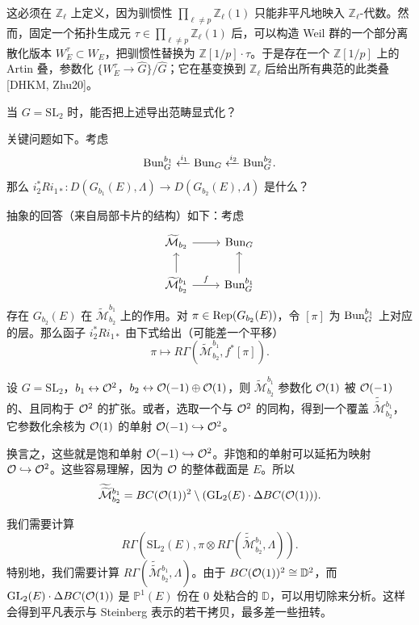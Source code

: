 这必须在 $\mathbb Z_\ell$ 上定义，因为驯惯性 $\prod_{\ell\neq p}\mathbb Z_\ell(1)$ 只能非平凡地映入 $\mathbb Z_\ell$-代数。然而，固定一个拓扑生成元 $\tau\in\prod_{\ell\neq p}\mathbb Z_\ell(1)$ 后，可以构造 Weil 群的一个部分离散化版本 $W_E^\tau\subset W_E$，把驯惯性替换为 $\mathbb Z[1/p]\cdot\tau$。于是存在一个 $\mathbb Z[1/p]$ 上的 Artin 叠，参数化 $\{W_E^\tau\to\widehat G\}/\widehat G$；它在基变换到 $\mathbb Z_\ell$ 后给出所有典范的此类叠 [DHKM, Zhu20]。

\begin{question}[Drinfeld]
当 $G=\mathrm{SL}_2$ 时，能否把上述导出范畴显式化？
\end{question}

关键问题如下。考虑
\[
\mathrm{Bun}_G^{b_1}\xleftarrow{i_1}\mathrm{Bun}_G\xleftarrow{i_2}\mathrm{Bun}_G^{b_2}.
\]
那么 $i_2^*Ri_{1*}\colon D(G_{b_1}(E),\Lambda)\to D(G_{b_2}(E),\Lambda)$ 是什么？

抽象的回答（来自局部卡片的结构）如下：考虑
\[
\begin{tikzcd}
\widetilde{\mathcal M}_{b_2} \arrow[r] & \Bun_G \\
\widetilde{\mathcal M}_{b_2}^{b_1} \arrow[r,"f"] \arrow[u] & \Bun_G^{b_1} \arrow[u]
\end{tikzcd}
\]
存在 $G_{b_2}(E)$ 在 $\widetilde{\mathcal M}_{b_2}^{b_1}$ 上的作用。对 $\pi\in\operatorname{Rep}(G_{b_2}(E))$，令 $[\pi]$ 为 $\mathrm{Bun}_G^{b_1}$ 上对应的层。那么函子 $i_2^*Ri_{1*}$ 由下式给出（可能差一个平移）
\[
\pi\mapsto R\Gamma(\widetilde{\mathcal M}_{b_2}^{b_1},f^*[\pi]).
\]


\begin{example}
设 $G=\mathrm{SL}_2$，$b_1\leftrightarrow\mathcal{O}^2$，$b_2\leftrightarrow\mathcal{O}(-1)\oplus\mathcal{O}(1)$，则 $\widetilde{\mathcal M}_{b_2}^{b_1}$ 参数化 $\mathcal{O}(1)$ 被 $\mathcal{O}(-1)$ 的、且同构于 $\mathcal{O}^2$ 的扩张。或者，选取一个与 $\mathcal{O}^2$ 的同构，得到一个覆盖 $\widetilde{\widetilde{\mathcal M}}{}^{b_1}_{b_2}$，它参数化余核为 $\mathcal{O}(1)$ 的单射 $\mathcal{O}(-1)\hookrightarrow\mathcal{O}^2$。
\end{example}

换言之，这些就是饱和单射 $\mathcal{O}(-1)\hookrightarrow\mathcal{O}^2$。非饱和的单射可以延拓为映射 $\mathcal{O}\hookrightarrow\mathcal{O}^2$。这些容易理解，因为 $\mathcal{O}$ 的整体截面是 $E$。所以
\[
\widetilde{\widetilde{\mathcal M}}{}^{b_1}_{b_2}=BC(\mathcal{O}(1))^2\setminus(\mathrm{GL}_2(E)\cdot\Delta BC(\mathcal{O}(1))).
\]

我们需要计算
\[
R\Gamma(\mathrm{SL}_2(E),\pi\otimes R\Gamma(\widetilde{\widetilde{\mathcal M}}{}^{b_1}_{b_2},\Lambda)).
\]
特别地，我们需要计算 $R\Gamma(\widetilde{\widetilde{\mathcal M}}{}^{b_1}_{b_2},\Lambda)$。由于 $BC(\mathcal{O}(1))^2\cong\mathbb D^2$，而 $\mathrm{GL}_2(E)\cdot\Delta BC(\mathcal{O}(1))$ 是 $\mathbb P^1(E)$ 份在 $0$ 处粘合的 $\mathbb D$，可以用切除来分析。这样会得到平凡表示与 Steinberg 表示的若干拷贝，最多差一些扭转。

